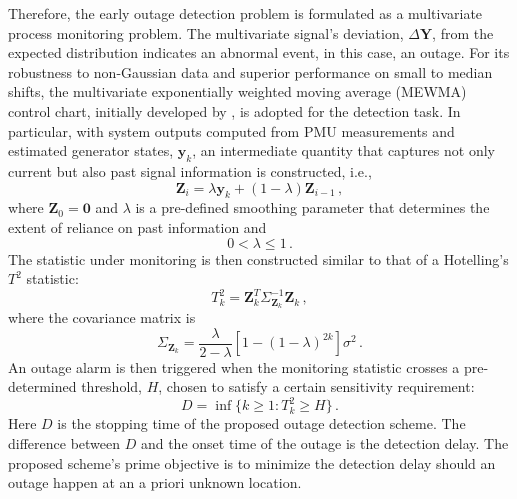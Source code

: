 Therefore, the early outage detection problem is formulated as a multivariate process monitoring problem. The multivariate signal's deviation, $\Delta \boldsymbol{Y}$, from the expected distribution indicates an abnormal event, in this case, an outage. For its robustness to non-Gaussian data and superior performance on small to median shifts, the multivariate exponentially weighted moving average (MEWMA) control chart, initially developed by \cite{lowry1992multivariate}, is adopted for the detection task. In particular, with system outputs computed from PMU measurements and estimated generator states, $\boldsymbol{y}_k$, an intermediate quantity that captures not only current but also past signal information is constructed, i.e.,
\begin{equation}
\label{ch4:eqn:ewma_z}
\boldsymbol{Z}_i = \lambda \boldsymbol{y}_k + (1 - \lambda) \boldsymbol{Z}_{i-1} \,,
\end{equation}
where $\boldsymbol{Z}_0 = \mathbf{0}$ and $\lambda$ is a pre-defined smoothing parameter that determines the extent of reliance on past information and 
$$
0<\lambda \le 1 \,.
$$
The statistic under monitoring is then constructed similar to that of a Hotelling's $T^2$ statistic:
\begin{equation}
\label{ch4:eqn:ewma_T}
T^2_k = \boldsymbol{Z}_k^T\Sigma_{\boldsymbol{Z}_k}^{-1}\boldsymbol{Z}_k \,,
\end{equation}
where the covariance matrix is 
$$
\Sigma_{\boldsymbol{Z}_k} = \frac{\lambda}{2 - \lambda}\left[1-(1-\lambda)^{2k}\right]\sigma^2 \,.
$$
An outage alarm is then triggered when the monitoring statistic crosses a pre-determined threshold, $H$, chosen to satisfy a certain sensitivity requirement:
\begin{equation}
\label{ch4:eqn:control_chart}
D = \inf\lbrace k\ge1 : T^2_k \ge H \rbrace \,.
\end{equation}
Here $D$ is the stopping time of the proposed outage detection scheme. The difference between $D$ and the onset time of the outage is the detection delay. The proposed scheme's prime objective is to minimize the detection delay should an outage happen at an a priori unknown location.

